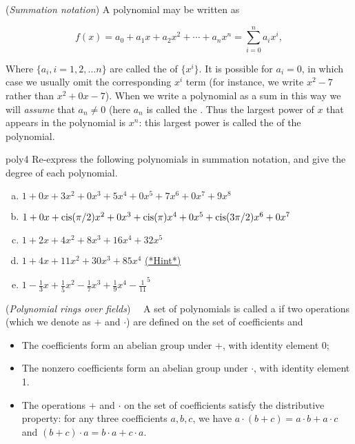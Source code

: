 \begin{defn} (\emph{Summation notation}) A polynomial may be written as

\[f(x) = a_0 + a_1 x +a_2 x^2 + \cdots + a_n x^n = \sum^{n}_{i=0} a_i x^i, \]

Where $\{ a_i ,  i=1,2,\ldots n\}$ are called the   of $\{x^i\}$. It is possible for $a_i = 0$, in which case we usually omit the corresponding $x^i$ term (for instance, we write $x^2 -7$ rather than $x^2 + 0x -7$). When we write a polynomial as a sum in this way we will \emph{assume} that $a_n \neq 0$ (here $a_n$ is called the .  Thus the largest power of $x$ that appears in the polynomial is $x^n$: this largest power is called the  of the polynomial.
\end{defn}
\begin{exercise}{poly4}
Re-express the following polynomials in summation notation,  and give the degree of each polynomial.
\begin{enumerate}[(a)]
\item
$1 + 0x + 3x^2 + 0x^3 + 5x^4 + 0x^5 + 7x^6 +0x^7 +  9x^8$
\item
$1 + 0x + \operatorname{cis}(\pi/2)x^2 + 0x^3 + \operatorname{cis}(\pi)x^4 + 0x^5  + \operatorname{cis}(3\pi/2)x^6 + 0x^7$
\item
$1+ 2x + 4x^2 + 8x^3 + 16x^4 + 32x^5$
\item
$1+4x+11x^2+30x^3+85x^4$
\hyperref[sec:polyrings:hints]{(*Hint*)} 
\item
$1-\frac{1}{3}x + \frac{1}{5}x^2 - \frac{1}{7}x^3 + \frac{1}{9}x^4 - \frac{1}{11}^5$
\end{enumerate}
\end{exercise}


\begin{defn} \label{def:polyring}(\emph{Polynomial rings over fields})~~
A set of polynomials is called a  if two operations (which we denote as $+$ and $\cdot$)  are defined on the set of coefficients and
\begin{itemize}
\item
The coefficients form an abelian group under +, with identity element 0;
\item
The nonzero coefficients form an abelian group under $\cdot$, with identity element 1.
\item The operations $+$ and $\cdot$ on the set of coefficients satisfy the distributive property: for any three coefficients $a,b,c$, we have $a \cdot (b + c) = a \cdot b + a \cdot c$ and 
$(b + c) \cdot a = b \cdot a + c \cdot a$.
\end{itemize}
\end{defn}

